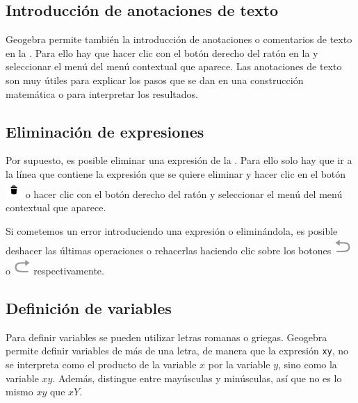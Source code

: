 \subsection*{Introducción de anotaciones de texto}
Geogebra permite también la introducción de anotaciones o comentarios de texto en la .
Para ello hay que hacer clic con el botón derecho del ratón en la  y seleccionar el menú  del menú contextual que aparece.
Las anotaciones de texto son muy útiles para explicar los pasos que se dan en una construcción matemática o para interpretar los resultados.


\subsection*{Eliminación de expresiones}
Por supuesto, es posible eliminar una expresión de la .
Para ello solo hay que ir a la línea que contiene la expresión que se quiere eliminar y hacer clic en el botón \includegraphics[scale=0.035]{img/introduccion/bin-button.png} o hacer clic con el botón derecho del ratón y seleccionar el menú  del menú contextual que aparece.

Si cometemos un error introduciendo una expresión o eliminándola, es posible deshacer las últimas operaciones o rehacerlas haciendo clic sobre los botones \includegraphics[scale=0.03]{img/introduccion/undo-button.png} o \includegraphics[scale=0.03]{img/introduccion/redo-button.png} respectivamente.


\subsection*{Definición de variables}
Para definir variables se pueden utilizar letras romanas o griegas.
Geogebra permite definir variables de más de una letra, de manera que la expresión \texttt{xy}, no se interpreta como el producto de la variable $x$ por la variable $y$, sino como la variable $xy$.
Además, distingue entre mayúsculas y minúsculas, así que no es lo mismo $xy$ que $xY$.


